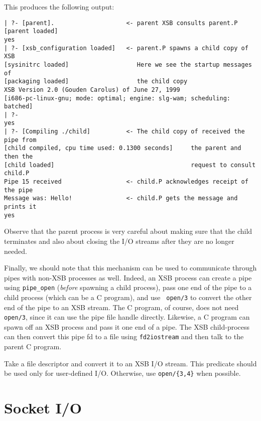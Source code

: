 \begin{description}
\begin{verbatim}
    \end{verbatim}
    This produces the following output:
    \begin{verbatim}
| ?- [parent].                    <- parent XSB consults parent.P
[parent loaded]
yes
| ?- [xsb_configuration loaded]   <- parent.P spawns a child copy of XSB
[sysinitrc loaded]                   Here we see the startup messages of
[packaging loaded]                   the child copy
XSB Version 2.0 (Gouden Carolus) of June 27, 1999
[i686-pc-linux-gnu; mode: optimal; engine: slg-wam; scheduling: batched]
| ?- 
yes
| ?- [Compiling ./child]          <- The child copy of received the pipe from
[child compiled, cpu time used: 0.1300 seconds]     the parent and then the
[child loaded]                                      request to consult child.P
Pipe 15 received                  <- child.P acknowledges receipt of the pipe
Message was: Hello!               <- child.P gets the message and prints it
yes       
    \end{verbatim}
    
    Observe that the parent process is very careful about making sure
    that the child terminates and also about closing the I/O streams
    after they are no longer needed.
    
    Finally, we should note that this mechanism can be used to
    communicate through pipes with non-XSB processes as well. Indeed,
    an XSB process can create a pipe using {\tt pipe\_open}
    (\emph{before} spawning a child process), pass one end of the pipe
    to a child process (which can be a C program), and use {\tt
    open/3} to convert the other end of the pipe to an XSB
    stream. The C program, of course, does not need {\tt open/3},
    since it can use the pipe file handle directly. Likewise, a C
    program can spawn off an XSB process and pass it one end of a
    pipe.  The XSB child-process can then convert this pipe fd to a
    file using {\tt fd2iostream} and then talk to the parent C program.

Take a file descriptor and convert it to an XSB I/O stream. This
predicate should be used only for user-defined I/O.  Otherwise, use
{\tt open/\{3,4\}} when possible.

\end{description}



\section{Socket I/O}

